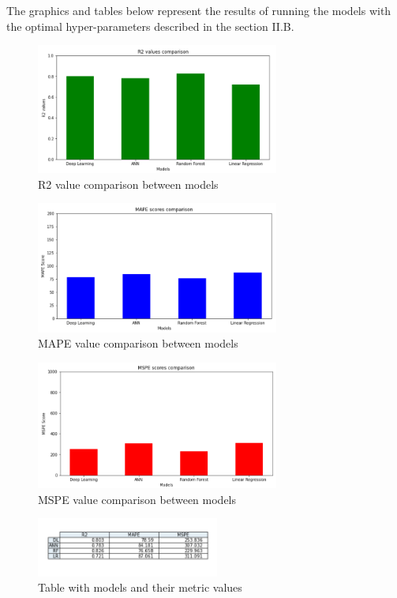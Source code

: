 \documentclass[journal]{IEEEtran} %
\begin{document}
The graphics and tables below represent the results of running the models with the optimal hyper-parameters described in the section II.B.\newline

\begin{figure}[htp]
    \centering
    \includegraphics[width=8cm]{Project1-Report_FAA/r2.png}
    \caption{R2 value comparison between models}
    \label{fig:galaxy}
\end{figure}

\begin{figure}[htp]
    \centering
    \includegraphics[width=8cm]{Project1-Report_FAA/mape.png}
    \caption{MAPE value comparison between models}
    \label{fig:galaxy}
\end{figure}

\begin{figure}[htp]
    \centering
    \includegraphics[width=8cm]{Project1-Report_FAA/mspe.png}
    \caption{MSPE value comparison between models}
    \label{fig:galaxy}
\end{figure}

\begin{figure}[htp]
    \centering
    \includegraphics[width=6cm]{Project1-Report_FAA/metrics_table.png}
    \caption{Table with models and their metric values}
    \label{fig:galaxy}
\end{figure}
\end{document}
